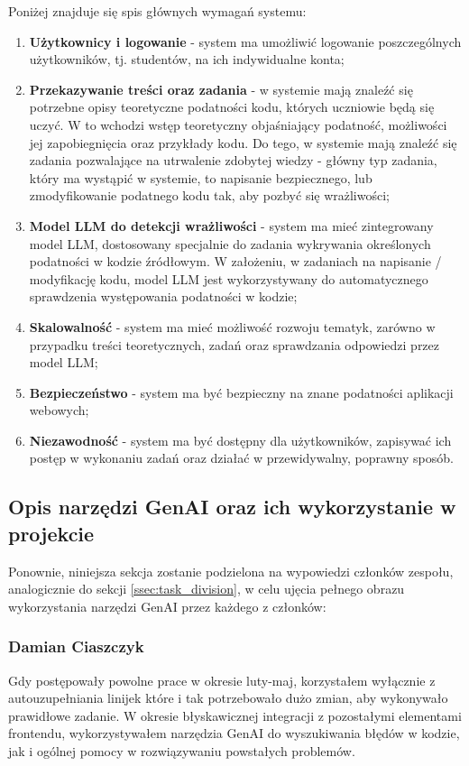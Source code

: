 \documentclass[12pt,a4paper]{article}
\begin{document}
Poniżej znajduje się spis głównych wymagań systemu:
\begin{enumerate}
    \item \textbf{Użytkownicy i logowanie} - system ma umożliwić logowanie poszczególnych użytkowników, tj. studentów, na ich indywidualne konta;
    \item \textbf{Przekazywanie treści oraz zadania} - w systemie mają znaleźć się potrzebne opisy teoretyczne podatności kodu, których uczniowie będą się uczyć. W to wchodzi wstęp teoretyczny objaśniający podatność, możliwości jej zapobiegnięcia oraz przykłady kodu. Do tego, w systemie mają znaleźć się zadania pozwalające na utrwalenie zdobytej wiedzy - główny typ zadania, który ma wystąpić w systemie, to napisanie bezpiecznego, lub zmodyfikowanie podatnego kodu tak, aby pozbyć się wrażliwości;
    \item \textbf{Model LLM do detekcji wrażliwości} - system ma mieć zintegrowany model LLM, dostosowany specjalnie do zadania wykrywania określonych podatności w kodzie źródłowym. W założeniu, w zadaniach na napisanie / modyfikację kodu, model LLM jest wykorzystywany do automatycznego sprawdzenia występowania podatności w kodzie;
    \item \textbf{Skalowalność} - system ma mieć możliwość rozwoju tematyk, zarówno w przypadku treści teoretycznych, zadań oraz sprawdzania odpowiedzi przez model LLM;  
    \item \textbf{Bezpieczeństwo} - system ma być bezpieczny na znane podatności aplikacji webowych;
    \item \textbf{Niezawodność} - system ma być dostępny dla użytkowników, zapisywać ich postęp w wykonaniu zadań oraz działać w przewidywalny, poprawny sposób.
\end{enumerate} 

\subsection{Opis narzędzi GenAI oraz ich wykorzystanie w projekcie}

Ponownie, niniejsza sekcja zostanie podzielona na wypowiedzi członków zespołu, analogicznie do sekcji \ref{ssec:task_division}, w celu ujęcia pełnego obrazu wykorzystania narzędzi GenAI przez każdego z członków: 

\subsubsection*{Damian Ciaszczyk}
Gdy postępowały powolne prace w okresie luty-maj, korzystałem wyłącznie z autouzupełniania linijek które i tak potrzebowało dużo zmian, aby wykonywało prawidłowe zadanie. W okresie błyskawicznej integracji z pozostałymi elementami frontendu, wykorzystywałem narzędzia GenAI do wyszukiwania błędów w kodzie, jak i ogólnej pomocy w rozwiązywaniu powstałych problemów.
\end{document}
